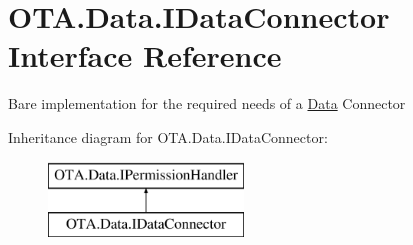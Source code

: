 \hypertarget{interface_o_t_a_1_1_data_1_1_i_data_connector}{}\section{O\+T\+A.\+Data.\+I\+Data\+Connector Interface Reference}
\label{interface_o_t_a_1_1_data_1_1_i_data_connector}


Bare implementation for the required needs of a \hyperlink{namespace_o_t_a_1_1_data}{Data} Connector  


Inheritance diagram for O\+T\+A.\+Data.\+I\+Data\+Connector\+:\begin{figure}[H]
\begin{center}
\leavevmode
\includegraphics[height=2.000000cm]{interface_o_t_a_1_1_data_1_1_i_data_connector}
\end{center}
\end{figure}
